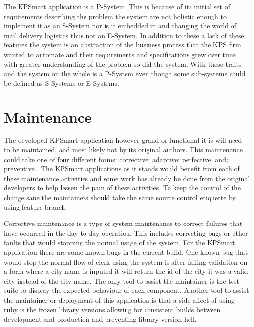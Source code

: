 \documentclass{style/CRPITStyle}
\renewcommand{\cite}{\citep}
\begin{document}
\vspace{.1in}

The KPSmart application is a P-System. This is because of its initial set of
requirements describing the problem the system are not holistic enough to
implement it as an S-System nor is it embedded in and changing the world of mail
delivery logistics thus not an E-System. In addition to these a lack of
these features the system is an abstraction of the business process that the
KPS firm wanted to automate and their requirements and specifications grew over
time with greater understanding of the problem so did the system. With these
traits and the system on the whole is a P-System even though some sub-systems
could be defined as S-Systems or E-Systems.

\section{Maintenance}
%
%
%

The developed KPSmart application however grand or functional it is will need
to be maintained, and most likely not by its original authors. This maintenance
could take one of four different forms: corrective; adaptive; perfective, and;
preventive \cite{Pigoski:1996}. 
The KPSmart applications as it stands would benefit from each of
these maintenance activities and some work has already be done from the original
developers to help lessen the pain of these activities.
To keep the control of the change sane the maintainers should take the same
source control etiquette by using feature branch.

\vspace{.1in}

Corrective maintenance is a type of system maintenance to correct failures that
have occurred in the day to day operation. This includes correcting bugs or
other faults that would stopping the normal usage of the system. 
For the KPSmart application there are some known bugs in the current build. 
One known bug that would stop the normal flow of clerk using the system is after
failing validation on a form where a city name is inputed it will return the id
of the city it was a valid city instead of the city name. The only tool to
assist the maintainer is the test suite to display the expected behaviour of
each component. Another tool to assist the maintainer or deployment of this
application is that a side affect of using ruby is the frozen library versions
allowing for consistent builds between development and production and preventing
library version hell.
\end{document}
